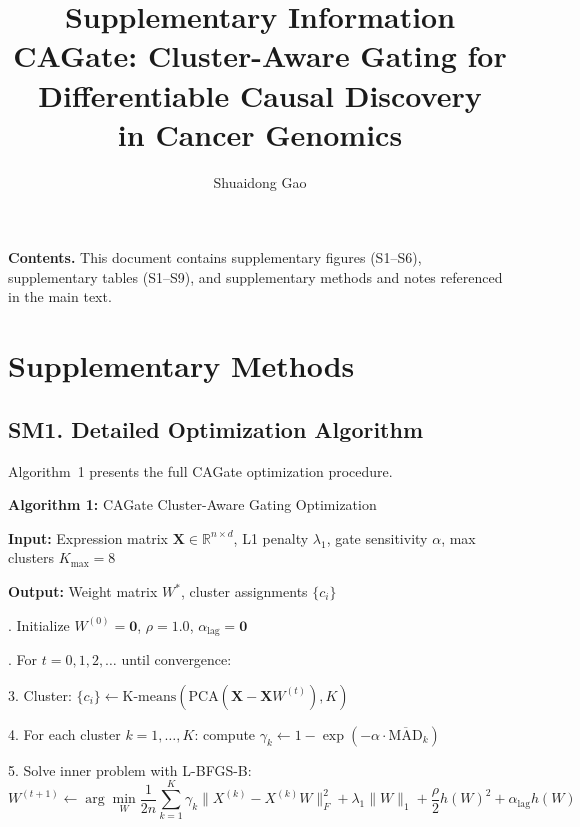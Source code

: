 \documentclass[11pt,a4paper]{article}
\title{\textbf{Supplementary Information}\\[0.5em]
\large CAGate: Cluster-Aware Gating for Differentiable Causal Discovery\\in Cancer Genomics}
\author{Shuaidong Gao}
\date{}
\begin{document}
\maketitle
\thispagestyle{empty}

\noindent\textbf{Contents.} This document contains supplementary figures (S1--S6), supplementary tables (S1--S9), and supplementary methods and notes referenced in the main text.

\vspace{1em}

\section*{Supplementary Methods}

\subsection*{SM1. Detailed Optimization Algorithm}

Algorithm~1 presents the full CAGate optimization procedure.

\vspace{0.5em}
\noindent\textbf{Algorithm 1:} CAGate Cluster-Aware Gating Optimization

\vspace{0.3em}
\noindent\textbf{Input:} Expression matrix $\mathbf{X} \in \mathbb{R}^{n \times d}$, L1 penalty $\lambda_1$, gate sensitivity $\alpha$, max clusters $K_{\max}=8$

\noindent\textbf{Output:} Weight matrix $W^*$, cluster assignments $\{c_i\}$

\vspace{0.3em}
. Initialize $W^{(0)} = \mathbf{0}$, $\rho = 1.0$, $\alpha_{\text{lag}} = \mathbf{0}$

. For $t = 0, 1, 2, \ldots$ until convergence:

\noindent \hspace{1em} 3. \quad Cluster: $\{c_i\} \leftarrow \text{K-means}(\text{PCA}(\mathbf{X} - \mathbf{X}W^{(t)}), K)$

\noindent \hspace{1em} 4. \quad For each cluster $k=1,\ldots,K$: compute $\gamma_k \leftarrow 1 - \exp(-\alpha \cdot \overline{\text{MAD}}_k)$

\noindent \hspace{1em} 5. \quad Solve inner problem with L-BFGS-B:
\[
W^{(t+1)} \leftarrow \arg\min_W \frac{1}{2n}\sum_{k=1}^K \gamma_k \|X^{(k)} - X^{(k)}W\|_F^2 + \lambda_1\|W\|_1 + \frac{\rho}{2}h(W)^2 + \alpha_{\text{lag}} h(W)
\]
\end{document}
